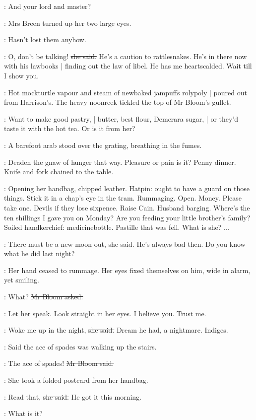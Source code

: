 \Bloom:
And your lord and master?

:
Mrs Breen turned up her two large eyes.

\BloomInt:
Hasn't lost them anyhow.

\josie:
O, don't be talking!
\sout{she said.}
He's a caution to rattlesnakes.
He's in there now with his lawbooks |
finding out the law of libel.
He has me heartscalded.
Wait till I show you.

:
Hot mockturtle vapour and steam of newbaked jampuffs rolypoly |
poured out from Harrison's.
The heavy noonreek tickled the top of Mr Bloom's gullet.

\BloomInt:
Want to make good pastry, |
butter, best flour, Demerara sugar, |
or they'd taste it with the hot tea.
Or is it from her?

:
A barefoot arab stood over the grating,
breathing in the fumes.

\BloomInt:
Deaden the gnaw of hunger that way.
Pleasure or pain is it?
Penny dinner.
Knife and fork
chained to the table.

\BloomInt:
Opening her handbag, chipped leather.
Hatpin:
ought to have a guard on those things.
Stick it in a chap's eye in the tram.
Rummaging.
Open.
Money.
Please take one.
Devils if they lose sixpence.
Raise Cain.
Husband barging.
Where's the ten shillings I gave you on Monday?
Are you feeding your little brother's family?
Soiled handkerchief:
medicinebottle.
Pastille that was fell.
What is she?
...

\josie:
There must be a new moon out,
\sout{she said.}
He's always bad then.
Do you know what he did last night?

:
Her hand ceased to rummage.
Her eyes fixed themselves on him,
wide in alarm,
yet smiling.

\Bloom:
What?
\sout{Mr Bloom asked.}

\BloomInt:
Let her speak.
Look straight in her eyes.
I believe you.
Trust me.

\josie:
Woke me up in the night,
\sout{she said.}
Dream he had,
a nightmare.
Indiges.

\josie:
Said the ace of spades was walking up the stairs.

\Bloom:
The ace of spades!
\sout{Mr Bloom said.}

:
She took a folded postcard from her handbag.

\josie:
Read that,
\sout{she said.}
He got it this morning.

\Bloom:
What is it?

